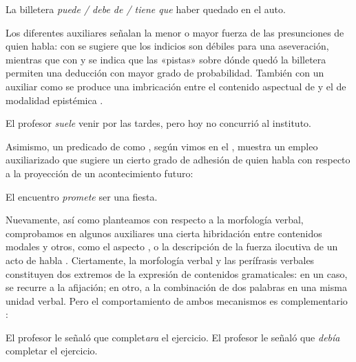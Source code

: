 \begin{exe}
  \ex\label{ex:14-billetera} La billetera \textit{puede / debe de / tiene que}
      haber quedado en el auto.
\end{exe}

Los diferentes auxiliares señalan la menor o mayor fuerza de las presunciones de
quien habla: con  se sugiere que los indicios son débiles para una
aseveración, mientras que con  y  se indica que
las «pistas» sobre dónde quedó la billetera permiten una deducción con mayor
grado de probabilidad. También con un auxiliar como  se produce una
imbricación entre el contenido aspectual de  y el de modalidad
epistémica \parencite{giammatteo2011}.

\begin{exe}
  \ex\label{ex:14-suele} El profesor \textit{suele} venir por las tardes, pero hoy
      no concurrió al instituto.
\end{exe}

Asimismo, un predicado de  como , según vimos
en el , muestra un empleo auxiliarizado que sugiere un cierto grado de
adhesión de quien habla con respecto a la proyección de un acontecimiento
futuro:

\begin{exe}
  \ex\label{ex:14-promete} El encuentro \textit{promete} ser una fiesta.
\end{exe}

Nuevamente, así como planteamos con respecto a la morfología verbal, comprobamos
en algunos auxiliares una cierta hibridación entre contenidos modales y otros,
como el aspecto , o la descripción de la fuerza ilocutiva de un
acto de habla . Ciertamente, la morfología verbal y las
perífrasis verbales constituyen dos extremos de la expresión de contenidos
gramaticales: en un caso, se recurre a la afijación; en otro, a la combinación de
dos palabras en una misma unidad verbal. Pero el comportamiento de ambos
mecanismos es complementario \parencite{marcovecchio2010}:

\begin{exe}
  \ex\label{ex:14-senalo1} El profesor le señaló que complet\textit{ara} el
      ejercicio.
  \ex\label{ex:14-senalo2} El profesor le señaló que \textit{debía} completar el
      ejercicio.
\end{exe}

